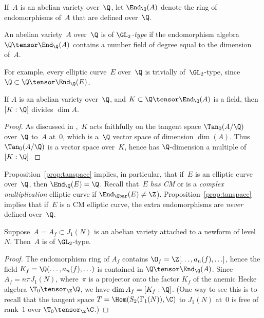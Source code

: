 \documentclass{report}
\begin{document}
If~$A$ is an abelian variety over~$\Q$, let $\End_{\Q}(A)$ denote the
ring of endomorphisms of~$A$ that are defined over~$\Q$.
\begin{definition}[$\GL_2$-type]
  An abelian variety~$A$ over~$\Q$ is of {\em $\GL_2$-type} if the
  endomorphism algebra $\Q\tensor \End_\Q(A)$ contains a number field
  of degree equal to the dimension of~$A$.
\end{definition}

For example, every elliptic curve~$E$ over~$\Q$ is trivially
of~$\GL_2$-type, since $\Q\subset \Q\tensor \End_\Q(E)$.

\begin{proposition}\label{prop:tanspace}
If $A$ is an abelian variety over~$\Q$, and
$K\subset \Q\tensor\End_\Q(A)$ is a field, then
$[K:\Q]$ divides $\dim A$.
\end{proposition}
\begin{proof}
  As discussed in \cite[\S2]{ribet:abvars},~$K$ acts faithfully on the
  tangent space $\Tan_0(A/\Q)$ over~$\Q$ to~$A$ at~$0$, which is
  a~$\Q$ vector space of dimension $\dim(A)$.  Thus $\Tan_0(A/\Q)$ is
  a vector space over~$K$, hence has $\Q$-dimension a multiple of
  $[K:\Q]$.
\end{proof}

Proposition~\ref{prop:tanspace} implies, in particular, that if~$E$ is
an elliptic curve over~$\Q$, then $\End_\Q(E)=\Q$.  Recall that~$E$ {\em has CM} or is a {\em complex multiplication}
elliptic curve if $\End_{\Qbar}(E)\neq \Z$).
Proposition~\ref{prop:tanspace} implies that if~$E$ is a CM elliptic
curve, the extra endomorphisms are {\em never} defined over~$\Q$.

\begin{proposition}
  Suppose~$A=A_f\subset J_1(N)$ is an abelian variety attached to a
  newform of level~$N$.  Then~$A$ is of $\GL_2$-type.
\end{proposition}
\begin{proof}
  The endomorphism ring of $A_f$ contains $\O_f = \Z[\ldots,
  a_n(f),\ldots]$, hence the field $K_f = \Q(\ldots, a_n(f), \ldots)$
  is contained in $\Q\tensor\End_\Q(A)$.  Since $A_f = n \pi J_1(N)$,
  where~$\pi$ is a projector onto the factor $K_f$ of the anemic Hecke
  algebra $\T_0\tensor_\Z\Q$, we have $\dim A_f = [K_f:\Q]$.  (One way
  to see this is to recall that the tangent space
  $T=\Hom(S_2(\Gamma_1(N)),\C)$ to $J_1(N)$ at~$0$ is free of rank~$1$
  over $\T_0\tensor_\Z\C$.)
\end{proof}
\end{document}
